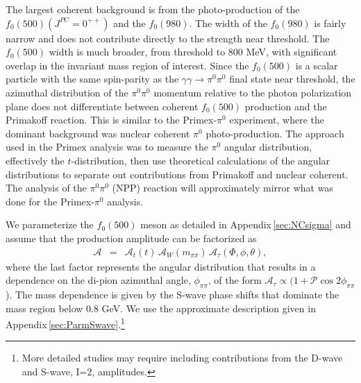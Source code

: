  The largest coherent background is  
from the photo-production of the $f_0(500)(J^{PC}=0^{++})$ and the $f_0(980)$.  The width of the
$f_0(980)$ is fairly narrow and does not contribute directly to the strength near threshold.
The $f_0(500)$ width is much
broader, from threshold to 800 MeV, with significant overlap in the
invariant mass region of interest.  Since the $f_0(500)$ is a scalar
particle with the same spin-parity as the $\gamma \gamma \rightarrow
\pi^0\pi^0$ final state near threshold, the azimuthal distribution of the $\pi^0\pi^0$ momentum relative to the
photon polarization plane does not differentiate between coherent
$f_0(500)$ production and the Primakoff reaction.  
This is similar to the Primex-$\pi^0$ experiment, where the dominant background was
nuclear coherent $\pi^0$ photo-production.  The approach used in the
Primex analysis was to measure the $\pi^0$ angular distribution,
effectively the $t$-distribution, then use theoretical calculations of
the angular distributions to separate out contributions from Primakoff
and nuclear coherent. The analysis of the $\pi^0\pi^0$ (NPP) reaction
will approximately mirror what was done for the Primex-$\pi^0$
analysis.  

We parameterize the $f_{0}(500)$ meson as detailed in Appendix\,\ref{sec:NCsigma} and assume that the production amplitude can be factorized as
\begin{eqnarray}
\mathcal{A} & = & \mathcal{A}_t(t) \, \mathcal{A}_W(m_{\pi\pi}) \, \mathcal{A}_\tau(\Phi, \phi, \theta),
\end{eqnarray}
where the last factor represents the angular distribution that results in a 
dependence on the di-pion azimuthal angle, $\phi_{\pi\pi}$, of the form $\mathcal{A}_\tau \propto (1 + \mathcal{P} \cos{2\phi_{\pi\pi}}$). 
The mass dependence is given by the S-wave phase shifts that dominate the mass region below 0.8 GeV. We use the approximate description given in 
Appendix\,\ref{sec:ParmSwave}.\footnote{More detailed studies may require including contributions from the D-wave and S-wave, I=2, amplitudes.} 

